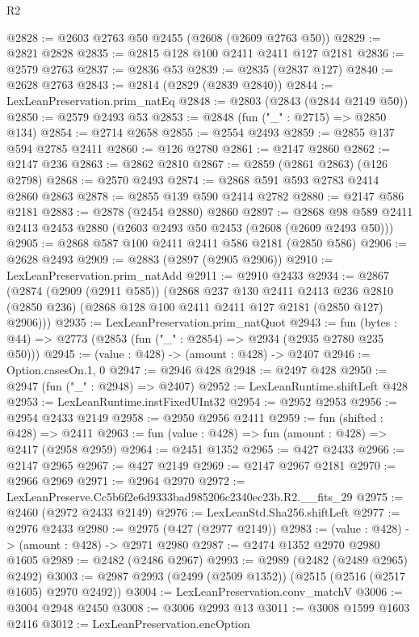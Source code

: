 \begin{lexlean}{R2}
\begin{coremodule}
@2828 := @2603 @2763 @50 @2455 (@2608 (@2609 @2763 @50))
@2829 := @2821 @2828
@2835 := @2815 @128 @100 @2411 @2411 @127 @2181
@2836 := @2579 @2763
@2837 := @2836 @53
@2839 := @2835 (@2837 @127)
@2840 := @2628 @2763
@2843 := @2814 (@2829 (@2839 @2840))
@2844 := LexLeanPreservation.prim_natEq
@2848 := @2803 (@2843 (@2844 @2149 @50))
@2850 := @2579 @2493 @53
@2853 := @2848 (fun ("_" : @2715) => @2850 @134)
@2854 := @2714 @2658
@2855 := @2554 @2493
@2859 := @2855 @137 @594 @2785 @2411
@2860 := @126 @2780
@2861 := @2147 @2860
@2862 := @2147 @236
@2863 := @2862 @2810
@2867 := @2859 (@2861 @2863) (@126 @2798)
@2868 := @2570 @2493
@2874 := @2868 @591 @593 @2783 @2414 @2860 @2863
@2878 := @2855 @139 @590 @2414 @2782
@2880 := @2147 @586 @2181
@2883 := @2878 (@2454 @2880) @2860
@2897 := @2868 @98 @589 @2411 @2413 @2453 @2880 (@2603 @2493 @50 @2453 (@2608 (@2609 @2493 @50)))
@2905 := @2868 @587 @100 @2411 @2411 @586 @2181 (@2850 @586)
@2906 := @2628 @2493
@2909 := @2883 (@2897 (@2905 @2906))
@2910 := LexLeanPreservation.prim_natAdd
@2911 := @2910 @2433
@2934 := @2867
    (@2874
      (@2909 (@2911 @585))
      (@2868
        @237
        @130
        @2411
        @2413
        @236
        @2810
        (@2850 @236)
        (@2868 @128 @100 @2411 @2411 @127 @2181 (@2850 @127) @2906)))
@2935 := LexLeanPreservation.prim_natQuot
@2943 := fun (bytes : @44) => @2773 (@2853 (fun ("_" : @2854) => @2934 (@2935 @2780 @235 @50)))
@2945 := (value : @428) -> (amount : @428) -> @2407
@2946 := Option.casesOn.{1, 0}
@2947 := @2946 @428
@2948 := @2497 @428
@2950 := @2947 (fun ("_" : @2948) => @2407)
@2952 := LexLeanRuntime.shiftLeft @428
@2953 := LexLeanRuntime.instFixedUInt32
@2954 := @2952 @2953
@2956 := @2954 @2433 @2149
@2958 := @2950 @2956 @2411
@2959 := fun (shifted : @428) => @2411
@2963 := fun (value : @428) => fun (amount : @428) => @2417 (@2958 @2959)
@2964 := @2451 @1352
@2965 := @427 @2433
@2966 := @2147 @2965
@2967 := @427 @2149
@2969 := @2147 @2967 @2181
@2970 := @2966 @2969
@2971 := @2964 @2970
@2972 := LexLeanPreserve.Cc5b6f2e6d9333bad985206c2340ec23b.R2.__fits_29
@2975 := @2460 (@2972 @2433 @2149)
@2976 := LexLeanStd.Sha256.shiftLeft
@2977 := @2976 @2433
@2980 := @2975 (@427 (@2977 @2149))
@2983 := (value : @428) -> (amount : @428) -> @2971 @2980
@2987 := @2474 @1352 @2970 @2980 @1605
@2989 := @2482 (@2486 @2967)
@2993 := @2989 (@2482 (@2489 @2965) @2492)
@3003 := @2987 @2993 (@2499 (@2509 @1352)) (@2515 (@2516 (@2517 @1605) @2970 @2492))
@3004 := LexLeanPreservation.conv_matchV
@3006 := @3004 @2948 @2450
@3008 := @3006 @2993 @13
@3011 := @3008 @1599 @1603 @2416
@3012 := LexLeanPreservation.encOption

\end{coremodule}
\end{lexlean}
